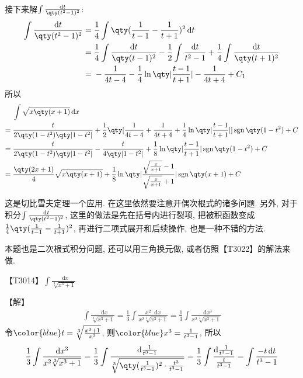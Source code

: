 \documentclass{ctexbook}
\DeclareMathOperator{\sgn}{sgn}
\newcommand*{\dif}{\mathop{}\!\mathrm{d}}
\begin{document}
{\begin{align*}
\end{align*}
接下来解$\int\frac{\dif{t}}{\qty(t^{2}-1)^{2}}$: 
\begin{align*}
\int\frac{\dif{t}}{\qty(t^{2}-1)^{2}}={}&\frac{1}{4}\int\qty(\frac{1}{t-1}-\frac{1}{t+1})^{2}\dif{t}\\
={}&\frac{1}{4}\int\frac{\dif{t}}{\qty(t-1)^{2}}-\frac{1}{2}\int\frac{\dif{t}}{t^{2}-1}+\frac{1}{4}\int\frac{\dif{t}}{\qty(t+1)^{2}}\\
={}&-\frac{1}{4t-4}-\frac{1}{4}\ln\qty|\frac{t-1}{t+1}|-\frac{1}{4t+4}+C_{1}
\end{align*}
所以
\begin{align*}
{}&\int\sqrt{x\qty(x+1)}\dif{x}\\
={}&\frac{t}{2\qty(1-t^{2})\qty|1-t^{2}|}+\frac{1}{2}\qty[\frac{1}{4t-4}+\frac{1}{4t+4}+\frac{1}{4}\ln\qty|\frac{t-1}{t+1}|]\sgn{\qty(1-t^{2})}+C\\
={}&\frac{t}{2\qty(1-t^{2})\qty|1-t^{2}|}-\frac{t}{4\qty|1-t^{2}|}+\frac{1}{8}\ln\qty|\frac{t-1}{t+1}|\sgn{\qty(1-t^{2})}+C\\
={}&\frac{\qty(2x+1)}{4}\sqrt{x\qty(x+1)}+\frac{1}{8}\ln\qty|\frac{\sqrt{\frac{x}{x+1}}-1}{\sqrt{\frac{x}{x+1}}+1}|\sgn{\qty(x+1)}+C
\end{align*}\par
{\kaishu 这是切比雪夫定理一个应用. 在这里依然要注意开偶次根式的诸多问题. 另外, 对于积分$\int\frac{\dif{t}}{\qty(t^{2}-1)^{2}}$, 这里的做法是先在括号内进行裂项, 把被积函数变成$\frac{1}{4}\qty(\frac{1}{t-1}-\frac{1}{t+1})^{2}$, 再进行二项式展开和后续操作, 也是一种不错的方法. \par
本题也是二次根式积分问题, 还可以用三角换元做, 或者仿照{\color{red}【T3022】}的解法来做. \par}
{\color{red}【T3014】}$\int\frac{\dif{x}}{\sqrt[3]{x^{3}+1}}$\par
【解】
\begin{align*}
\int\frac{\dif{x}}{\sqrt[3]{x^{3}+1}}=\frac{1}{3}\int\frac{x^{2}\dif{x}}{x^{2}\sqrt[3]{x^{3}+1}}=\frac{1}{3}\int\frac{\dif{x^{3}}}{x^{2}\sqrt[3]{x^{3}+1}}
\end{align*}
令$\color{blue}t=\sqrt[3]{\frac{x^{3}+1}{x^{3}}}$, 则$\color{blue}x^{3}=\frac{1}{t^{3}-1}$, 所以
\begin{align*}
\frac{1}{3}\int\frac{\dif{x^{3}}}{x^{2}\sqrt[3]{x^{3}+1}}=\frac{1}{3}\int\frac{\dif{\frac{1}{t^{3}-1}}}{\sqrt[3]{\qty(\frac{1}{t^{3}-1})^{2}\cdot\frac{t^{3}}{t^{3}-1}}}=\frac{1}{3}\int\frac{\dif{\frac{1}{t^{3}-1}}}{\frac{t}{t^{3}-1}}=\int\frac{-t\dif{t}}{t^{3}-1}
\end{align*}
}
\end{document}
